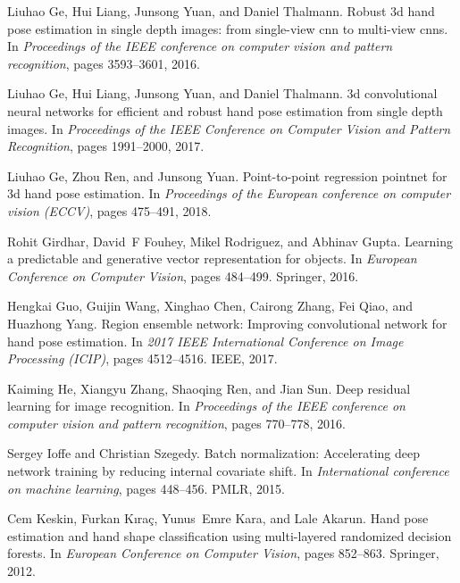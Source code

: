 \documentclass[10pt,twocolumn,letterpaper]{article}
\begin{document}
\begin{thebibliography}{10}
Liuhao Ge, Hui Liang, Junsong Yuan, and Daniel Thalmann.
\newblock Robust 3d hand pose estimation in single depth images: from
  single-view cnn to multi-view cnns.
\newblock In {\em Proceedings of the IEEE conference on computer vision and
  pattern recognition}, pages 3593--3601, 2016.

Liuhao Ge, Hui Liang, Junsong Yuan, and Daniel Thalmann.
\newblock 3d convolutional neural networks for efficient and robust hand pose
  estimation from single depth images.
\newblock In {\em Proceedings of the IEEE Conference on Computer Vision and
  Pattern Recognition}, pages 1991--2000, 2017.

Liuhao Ge, Zhou Ren, and Junsong Yuan.
\newblock Point-to-point regression pointnet for 3d hand pose estimation.
\newblock In {\em Proceedings of the European conference on computer vision
  (ECCV)}, pages 475--491, 2018.

Rohit Girdhar, David~F Fouhey, Mikel Rodriguez, and Abhinav Gupta.
\newblock Learning a predictable and generative vector representation for
  objects.
\newblock In {\em European Conference on Computer Vision}, pages 484--499.
  Springer, 2016.

Hengkai Guo, Guijin Wang, Xinghao Chen, Cairong Zhang, Fei Qiao, and Huazhong
  Yang.
\newblock Region ensemble network: Improving convolutional network for hand
  pose estimation.
\newblock In {\em 2017 IEEE International Conference on Image Processing
  (ICIP)}, pages 4512--4516. IEEE, 2017.

Kaiming He, Xiangyu Zhang, Shaoqing Ren, and Jian Sun.
\newblock Deep residual learning for image recognition.
\newblock In {\em Proceedings of the IEEE conference on computer vision and
  pattern recognition}, pages 770--778, 2016.

Sergey Ioffe and Christian Szegedy.
\newblock Batch normalization: Accelerating deep network training by reducing
  internal covariate shift.
\newblock In {\em International conference on machine learning}, pages
  448--456. PMLR, 2015.

Cem Keskin, Furkan K{\i}ra{\c{c}}, Yunus~Emre Kara, and Lale Akarun.
\newblock Hand pose estimation and hand shape classification using
  multi-layered randomized decision forests.
\newblock In {\em European Conference on Computer Vision}, pages 852--863.
  Springer, 2012.


\end{thebibliography}
\end{document}
